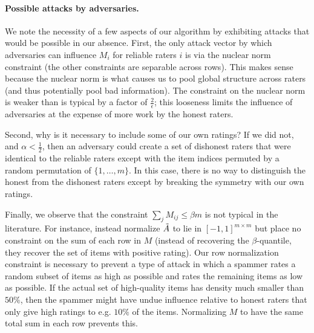\paragraph{Possible attacks by adversaries.} We note the necessity of a 
few aspects of our algorithm by exhibiting attacks that would be possible 
in our absence. First, the only attack vector by which adversaries can 
influence $M_i$ for reliable raters $i$ is via the nuclear norm constraint 
(the other constraints are separable across rows). This makes sense because 
the nuclear norm is what causes us to pool global structure across 
raters (and thus potentially pool bad information). The constraint on the 
nuclear norm is weaker than is typical by a factor of $\frac{2}{\epsilon}$; 
this looseness limits the influence of adversaries at the expense of more 
work by the honest raters.

Second, why is it necessary to include some of our own ratings? 
If we did not, and $\alpha < \frac{1}{2}$, then an adversary could create a set of 
dishonest raters that were identical to the reliable raters except with the 
item indices permuted by a random permutation of $\{1,\ldots,m\}$. In this case, 
there is no way to distinguish the honest from the dishonest raters except by 
breaking the symmetry with our own ratings.

Finally, we observe that the constraint $\sum_j M_{ij} \leq \beta m$ is 
not typical in the literature. For instance, \citep{chen2014improved} 
instead normalize $\tilde{A}$ to lie in $[-1,1]^{m \times m}$ but place no 
constraint on the sum of each row in $M$ (instead of recovering 
the $\beta$-quantile, they recover the set of items with positive rating).
Our row normalization constraint is necessary to prevent a type of attack 
in which a spammer rates a random subset of items as high as possible and 
rates the remaining items as low as possible. If the actual set of 
high-quality items has density much smaller than $50\%$, then the 
spammer might have undue influence relative to honest raters that 
only give high ratings to e.g. $10\%$ of the items. Normalizing $M$ to 
have the same total sum in each row prevents this.
